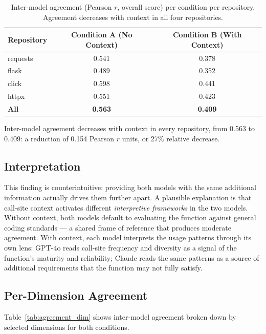 \documentclass[12pt]{report}
\begin{document}
\begin{table}[htbp]
\centering
\begin{tabular}{lcc}
\toprule
\textbf{Repository} & \textbf{Condition A (No Context)} & \textbf{Condition B (With Context)} \\
\midrule
requests & 0.541 & 0.378 \\
flask    & 0.489 & 0.352 \\
click    & 0.598 & 0.441 \\
httpx    & 0.551 & 0.423 \\
\midrule
\textbf{All} & \textbf{0.563} & \textbf{0.409} \\
\bottomrule
\end{tabular}
\caption{Inter-model agreement (Pearson $r$, overall score) per condition per repository. Agreement decreases with context in all four repositories.}
\label{tab:agreement_full}
\end{table}

Inter-model agreement decreases with context in every repository, from 0.563 to 0.409: a reduction of 0.154 Pearson $r$ units, or 27\% relative decrease.

\subsection{Interpretation}

This finding is counterintuitive: providing both models with the same additional information actually drives them further apart. A plausible explanation is that call-site context activates different \textit{interpretive frameworks} in the two models. Without context, both models default to evaluating the function against general coding standards --- a shared frame of reference that produces moderate agreement. With context, each model interprets the usage patterns through its own lens: GPT-4o reads call-site frequency and diversity as a signal of the function's maturity and reliability; Claude reads the same patterns as a source of additional requirements that the function may not fully satisfy.

\subsection{Per-Dimension Agreement}

Table~\ref{tab:agreement_dim} shows inter-model agreement broken down by selected dimensions for both conditions.
\end{document}
